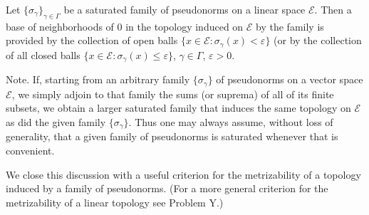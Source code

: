 Let $\{\sigma_{\gamma}\}_{\gamma \in \Gamma}$ be a saturated family of pseudonorms on a linear space $\mathcal{E}$. Then a base of neighborhoods of 0 in the topology induced on $\mathcal{E}$ by the family is provided by the collection of open balls $\{x \in \mathcal{E} : \sigma_{\gamma}(x) < \varepsilon\}$ (or by the collection of all closed balls $\{x \in \mathcal{E} : \sigma_{\gamma}(x) \leq \varepsilon\}$, $\gamma \in \Gamma$, $\varepsilon > 0$.

Note. If, starting from an arbitrary family $\{\sigma_{\gamma}\}$ of pseudonorms on a vector space $\mathcal{E}$, we simply adjoin to that family the sums (or suprema) of all of its finite subsets, we obtain a larger saturated family that induces the same topology on $\mathcal{E}$ as did the given family $\{\sigma_{\gamma}\}$. Thus one may always assume, without loss of generality, that a given family of pseudonorms is saturated whenever that is convenient.

We close this discussion with a useful criterion for the metrizability of a topology induced by a family of pseudonorms. (For a more general criterion for the metrizability of a linear topology see Problem Y.)
